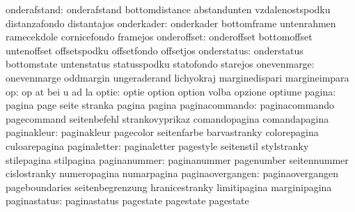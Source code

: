              onderafstand: onderafstand              bottomdistance
                           abstandunten              vzdalenostspodku
                           distanzafondo             distantajos
               onderkader: onderkader                bottomframe
                           untenrahmen               ramecekdole
                           cornicefondo              framejos
              onderoffset: onderoffset               bottomoffset
                           untenoffset               offsetspodku
                           offsetfondo               offsetjos
              onderstatus: onderstatus               bottomstate
                           untenstatus               statusspodku
                           statofondo                starejos
              onevenmarge: onevenmarge               oddmargin
                           ungeraderand              lichyokraj
                           marginedispari            margineimpara
                       op: op                        at
                           bei                       u
                           ad                        la
                    optie: optie                     option
                           option                    volba
                           opzione                   optiune
                   pagina: pagina                    page
                           seite                     stranka
                           pagina                    pagina
           paginacommando: paginacommando            pagecommand
                           seitenbefehl              strankovyprikaz
                           comandopagina             comandapagina
              paginakleur: paginakleur               pagecolor
                           seitenfarbe               barvastranky
                           colorepagina              culoarepagina
             paginaletter: paginaletter              pagestyle
                           seitenstil                stylstranky
                           stilepagina               stilpagina
             paginanummer: paginanummer              pagenumber
                           seitennummer              cislostranky
                           numeropagina              numarpagina
         paginaovergangen: paginaovergangen          pageboundaries
                           seitenbegrenzung          hranicestranky
                           limitipagina              marginipagina
             paginastatus: paginastatus              pagestate
                           pagestate                 pagestate
